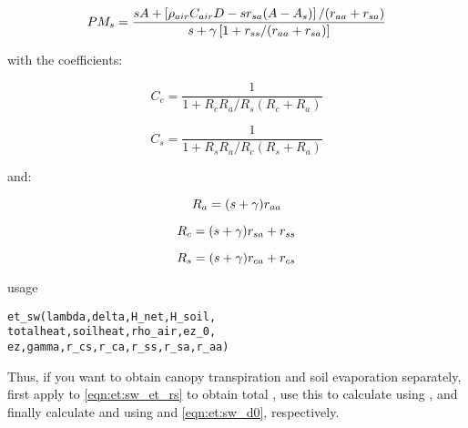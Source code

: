 \begin{equation} \label{eqn:et:sw_et_pms}
PM_s = \frac{s A + \left[ \rho_{air} C_{air} D - s r_{sa} (A - A_s) \right] / (r_{aa} + r_{sa})}{s + \gamma \left[ 1 + r_{ss} / (r_{aa} + r_{sa}) \right] }
\end{equation}

with the coefficients:

\begin{equation} \label{eqn:et:sw_et_cc}
C_c = \frac{1}{1 + R_c R_a / R_s (R_c + R_a)}
\end{equation}

\begin{equation} \label{eqn:et:sw_et_cs}
C_s = \frac{1}{1 + R_s R_a / R_c (R_s + R_a)}
\end{equation}

and:

\begin{equation} \label{eqn:et:sw_et_ra}
R_a = (s + \gamma) r_{aa}
\end{equation}

\begin{equation} \label{eqn:et:sw_et_rc}
R_c = (s + \gamma) r_{sa} + r_{ss}
\end{equation}

\begin{equation} \label{eqn:et:sw_et_rs}
R_s = (s + \gamma) r_{ca} + r_{cs}
\end{equation}

\noindent
usage
\begin{verbatim}
et_sw(lambda,delta,H_net,H_soil,
totalheat,soilheat,rho_air,ez_0,
ez,gamma,r_cs,r_ca,r_ss,r_sa,r_aa)
\end{verbatim}

Thus, if you want to obtain canopy transpiration and soil evaporation separately, first apply  to \ref{eqn:et:sw_et_rs} to obtain total \et{}, use this to calculate \vapPresDefCano{} using , and finally calculate \etTransp{} and \etEvap{} using  and \ref{eqn:et:sw_d0}, respectively.







